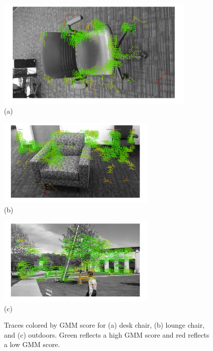 \begin{figure}[tb]
	\hspace{-0.6cm}
	\begin{minipage}[b]{0.5\linewidth}
		\centering
		\includegraphics[height=2.1in,angle=-90]{figs/desk-1.pdf}\\ (a)
	\end{minipage}
	\hspace{0cm}
	\begin{minipage}[b]{0.5\linewidth}
		\centering
		\begin{minipage}[b]{\linewidth}
			\centering
			\includegraphics[width=3in]{figs/lounge-1.pdf} \\ (b)
		\end{minipage}
		\vspace{0.1cm}
		\begin{minipage}[b]{\linewidth}
			\centering
			\includegraphics[width=3in]{figs/outdoor3-90.pdf} \\ (c)
		\end{minipage}

	\end{minipage}
	\caption{Traces colored by GMM score for (a) desk chair, (b) lounge chair, and (c) outdoors.  Green reflects a high GMM score and red reflects a low GMM score.}
	\label{fig:colored-traces}
\end{figure}


